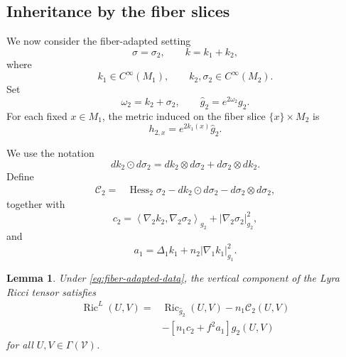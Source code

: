 \documentclass[a4paper,11pt]{article}
\theoremstyle{plain}
\newtheorem{lemma}{Lemma}[section]
\numberwithin{equation}{section}
\begin{document}
\subsection{Inheritance by the fiber slices}
\label{subsec:fiber-inheritance}

We now consider the fiber-adapted setting
\begin{equation}
	\sigma=\sigma_{2},
	\qquad
	k=k_{1}+k_{2},
	\label{eq:fiber-adapted-data}
\end{equation}
where
\[
k_{1}\in C^{\infty}(M_{1}),
\qquad
k_{2},\sigma_{2}\in C^{\infty}(M_{2}).
\]
Set
\begin{equation}
	\omega_{2}
	=
	k_{2}+\sigma_{2},
	\qquad
	\widehat g_{2}
	=
	e^{2\omega_{2}}g_{2}.
	\label{eq:fiber-effective-metric}
\end{equation}
For each fixed \(x\in M_{1}\), the metric induced on the fiber
slice \(\{x\}\times M_{2}\) is
\begin{equation}
	h_{2,x}
	=
	e^{2k_{1}(x)}\widehat g_{2}.
	\label{eq:fiber-slice-metric}
\end{equation}

We use the notation
\begin{equation}
	dk_{2}\odot d\sigma_{2}
	=
	dk_{2}\otimes d\sigma_{2}
	+
	d\sigma_{2}\otimes dk_{2}.
	\label{eq:symmetric-product-definition}
\end{equation}
Define
\begin{align}
	\mathcal C_{2}
	={}&
	\operatorname{Hess}_{2}\sigma_{2}
	-
	dk_{2}\odot d\sigma_{2}
	-
	d\sigma_{2}\otimes d\sigma_{2},
	\label{eq:fiber-inheritance-tensor}
\end{align}
together with
\begin{equation}
	c_{2}
	=
	\left\langle
	\nabla_{2}k_{2},
	\nabla_{2}\sigma_{2}
	\right\rangle_{g_{2}}
	+
	\left\lvert
	\nabla_{2}\sigma_{2}
	\right\rvert_{g_{2}}^{2},
	\label{eq:fiber-inheritance-scalar}
\end{equation}
and
\begin{equation}
	a_{1}
	=
	\Delta_{1}k_{1}
	+
	n_{2}
	\left\lvert
	\nabla_{1}k_{1}
	\right\rvert_{g_{1}}^{2}.
	\label{eq:fiber-base-scalar}
\end{equation}

\begin{lemma}
	\label{lem:fiber-lyra-ricci-splitting}
	Under \eqref{eq:fiber-adapted-data}, the vertical component of
	the Lyra Ricci tensor satisfies
	\begin{align}
		\operatorname{Ric}^{L}(U,V)
		={}&
		\operatorname{Ric}_{\widehat g_{2}}(U,V)
		-
		n_{1}\mathcal C_{2}(U,V)
		\nonumber\\
		&-
		\left[
		n_{1}c_{2}
		+
		f^{2}a_{1}
		\right]
		g_{2}(U,V)
		\label{eq:fiber-lyra-ricci-splitting}
	\end{align}
	for all \(U,V\in\Gamma(\mathcal V)\).
\end{lemma}
\end{document}
